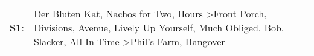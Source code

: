 \begin{supertabular}{p{0.03\textwidth}p{0.92\textwidth}}
 \textbf{S1}:  &  Der Bluten Kat\textsuperscript{}, \enspace Nachos for Two\textsuperscript{}, \enspace Hours\textsuperscript{} \textgreater \enspace Front Porch\textsuperscript{}, \enspace Divisions\textsuperscript{}, \enspace Avenue\textsuperscript{}, \enspace Lively Up Yourself\textsuperscript{}, \enspace Much Obliged\textsuperscript{}, \enspace Bob\textsuperscript{}, \enspace Slacker\textsuperscript{}, \enspace All In Time\textsuperscript{} \textgreater \enspace Phil's Farm\textsuperscript{}, \enspace Hangover\textsuperscript{}  \enspace  \\
\end{supertabular}
